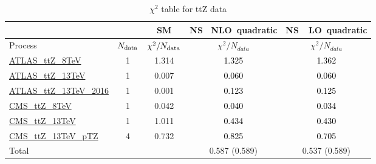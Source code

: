 \documentclass{article}
\begin{document}
\begin{table}[H]
\centering
\begin{tabular}{|l|c|c|c|c|}
\hline
 \multicolumn{2}{|c|}{} & SM& \rm NS \ NLO\ quadratic& \rm NS\ \ LO\ quadratic\\ \hline
Process & $N_{\rm data}$ & $\chi^ 2/N_{\rm data}$& $\chi^ 2/N_{data}$& $\chi^ 2/N_{data}$\\ \hline
\href{https://arxiv.org/abs/1509.05276}{ATLAS_ttZ_8TeV} & 1 & 1.314 & \textcolor{black}                            {1.325} & \textcolor{black}                            {1.362} \\ \hline
\href{https://arxiv.org/abs/1609.01599}{ATLAS_ttZ_13TeV} & 1 & 0.007 & \textcolor{black}                            {0.060} & \textcolor{black}                            {0.060} \\ \hline
\href{https://arxiv.org/abs/1901.03584}{ATLAS_ttZ_13TeV_2016} & 1 & 0.001 & \textcolor{black}                            {0.123} & \textcolor{black}                            {0.125} \\ \hline
\href{https://arxiv.org/abs/1510.01131}{CMS_ttZ_8TeV} & 1 & 0.042 & \textcolor{black}                            {0.040} & \textcolor{black}                            {0.034} \\ \hline
\href{https://arxiv.org/abs/1711.02547}{CMS_ttZ_13TeV} & 1 & 1.011 & \textcolor{black}                            {0.434} & \textcolor{black}                            {0.430} \\ \hline
\href{https://arxiv.org/abs/1907.11270}{CMS_ttZ_13TeV_pTZ} & 4 & 0.732 & \textcolor{black}                            {0.825} & \textcolor{black}                            {0.705} \\ \hline
\hline Total & &  & 0.587 (0.589) & 0.537 (0.589) \\ \hline
\end{tabular}
\caption{$\chi^2$ table for ttZ data}
\end{table}
\end{document}
